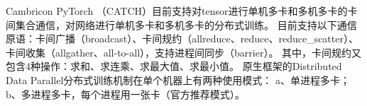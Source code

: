 




Cambricon PyTorch （CATCH）目前支持对tensor进行单机多卡和多机多卡的卡间集合通信，对网络进行单机多卡和多机多卡的分布式训练。
目前支持以下通信原语：卡间广播（broadcast）、卡间规约（allreduce、reduce、reduce\_scatter）、
卡间收集（allgather、all-to-all），支持进程间同步（barrier）。
其中，卡间规约又包含4种操作：求和、求连乘、求最大值、求最小值。
原生框架的Distributed Data Parallel分布式训练机制在单个机器上有两种使用模式：
a、单进程多卡；b、多进程多卡，每个进程用一张卡（官方推荐模式）。

